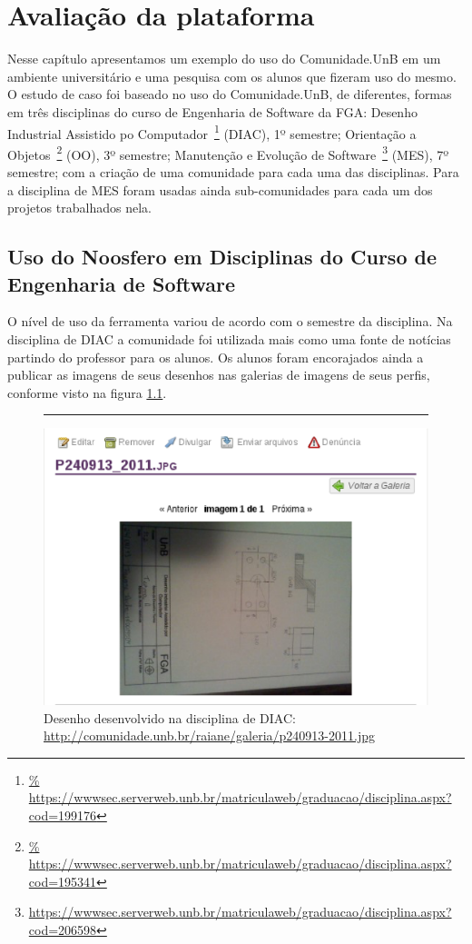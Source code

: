 \chapter{Avaliação da plataforma}

Nesse capítulo apresentamos um exemplo do uso do Comunidade.UnB em um ambiente
universitário e uma pesquisa com os alunos que fizeram uso do mesmo.
%
O estudo de caso foi baseado no uso do Comunidade.UnB, de diferentes, formas em
três disciplinas do curso de Engenharia de Software da FGA:
%
Desenho Industrial Assistido po Computador~\footnote{\url{%
https://wwwsec.serverweb.unb.br/matriculaweb/graduacao/disciplina.aspx?cod=199176}} (DIAC), 1º semestre;
%
Orientação a Objetos~\footnote{\url{%
https://wwwsec.serverweb.unb.br/matriculaweb/graduacao/disciplina.aspx?cod=195341}}
(OO), 3º semestre;
%
Manutenção e Evolução de Software~\footnote{\url{
https://wwwsec.serverweb.unb.br/matriculaweb/graduacao/disciplina.aspx?cod=206598}}
(MES), 7º semestre;
%
com a criação de uma comunidade para cada uma das disciplinas. Para a disciplina de
MES foram usadas ainda sub-comunidades para cada um dos projetos trabalhados nela.

\section{Uso do Noosfero em Disciplinas do Curso de Engenharia de Software}
\label{mes-unb}

O nível de uso da ferramenta variou de acordo com o semestre da disciplina. Na
disciplina de DIAC a comunidade foi utilizada mais como uma fonte de notícias
partindo do professor para os alunos. Os alunos foram encorajados ainda a publicar
as imagens de seus desenhos nas galerias de imagens de seus perfis, conforme
visto na figura \ref{imagem-diac}.

\begin{figure}[h!]
    \centering
		\rule{1cm}{1cm}
    \includegraphics[keepaspectratio=true,scale=0.65]
      {figuras/imagem-diac.eps}
    \caption{Desenho desenvolvido na disciplina de DIAC:\newline
\url{http://comunidade.unb.br/raiane/galeria/p240913-2011.jpg}}
    \label{imagem-diac}
\end{figure}

